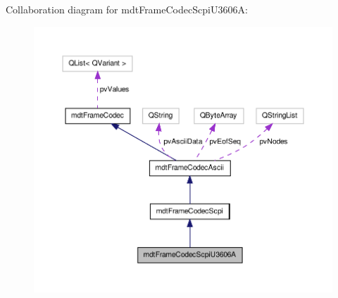 Collaboration diagram for mdt\-Frame\-Codec\-Scpi\-U3606\-A\-:
\nopagebreak
\begin{figure}[H]
\begin{center}
\leavevmode
\includegraphics[width=350pt]{classmdt_frame_codec_scpi_u3606_a__coll__graph}
\end{center}
\end{figure}
